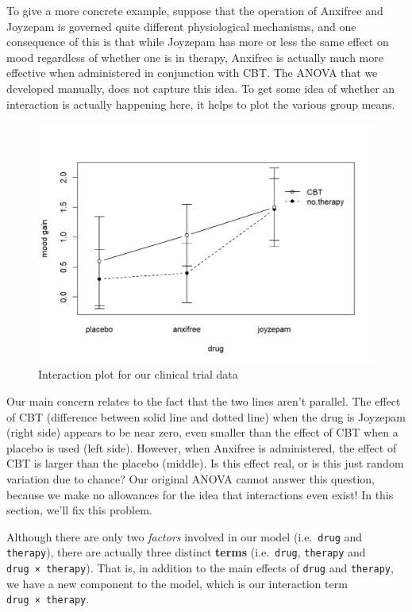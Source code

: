 \documentclass[
]{book}
\theoremstyle{definition}
\theoremstyle{definition}
\theoremstyle{definition}
\theoremstyle{definition}
\theoremstyle{remark}
\begin{document}
To give a more concrete example, suppose that the operation of Anxifree and Joyzepam is governed quite different physiological mechanisms, and one consequence of this is that while Joyzepam has more or less the same effect on mood regardless of whether one is in therapy, Anxifree is actually much more effective when administered in conjunction with CBT. The ANOVA that we developed manually, does not capture this idea. To get some idea of whether an interaction is actually happening here, it helps to plot the various group means.

\begin{figure}

{\centering \includegraphics[width=0.66\linewidth]{resources/image/interactionplot} 

}

\caption{Interaction plot for our clinical trial data}\label{fig:interactionplot}
\end{figure}

Our main concern relates to the fact that the two lines aren't parallel. The effect of CBT (difference between solid line and dotted line) when the drug is Joyzepam (right side) appears to be near zero, even smaller than the effect of CBT when a placebo is used (left side). However, when Anxifree is administered, the effect of CBT is larger than the placebo (middle). Is this effect real, or is this just random variation due to chance? Our original ANOVA cannot answer this question, because we make no allowances for the idea that interactions even exist! In this section, we'll fix this problem.

Although there are only two \emph{factors} involved in our model (i.e.~\texttt{drug} and \texttt{therapy}), there are actually three distinct \textbf{terms} (i.e.~\texttt{drug}, \texttt{therapy} and \texttt{drug\ ×\ therapy}). That is, in addition to the main effects of \texttt{drug} and \texttt{therapy}, we have a new component to the model, which is our interaction term \texttt{drug\ ×\ therapy}.
\end{document}
